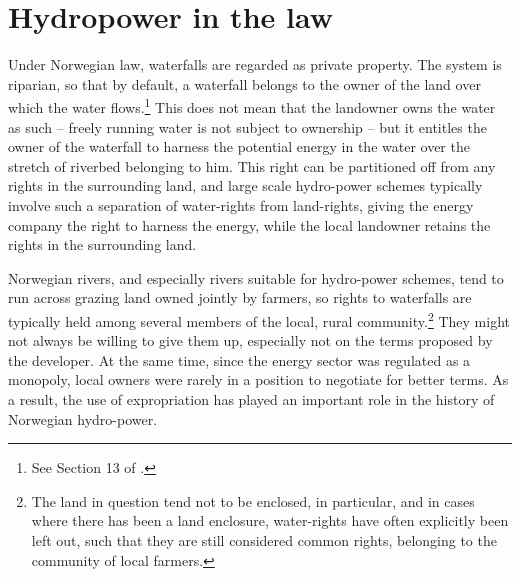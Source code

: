 \section{Hydropower in the law}\label{sec:hl}

Under Norwegian law, waterfalls are regarded as private property. The system is riparian, so that by default, a waterfall belongs to the owner of the land over which the water flows.\footnote{See Section 13 of \cite{wra00}.} This does not mean that the landowner owns the water as such -- freely running water is not subject to ownership -- but it entitles the owner of the waterfall to harness the potential energy in the water over the stretch of riverbed belonging to him. This right can be partitioned off from any rights in the surrounding land, and large scale hydro-power schemes typically involve such a separation of water-rights from land-rights, giving the energy company the right to harness the energy, while the local landowner retains the rights in the surrounding land.

Norwegian rivers, and especially rivers suitable for hydro-power schemes, tend to run across grazing land owned jointly by farmers, so rights to waterfalls are typically held among several members of the local, rural community.\footnote{The land in question tend not to be enclosed, in particular, and in cases where there has been a land enclosure, water-rights have often explicitly been left out, such that they are still considered common rights, belonging to the community of local farmers.} They might not always be willing to give them up, especially not on the terms proposed by the developer. At the same time, since the energy sector was regulated as a monopoly, local owners were rarely in a position to negotiate for better terms. As a result, the use of expropriation has played an important role in the history of Norwegian hydro-power. 




